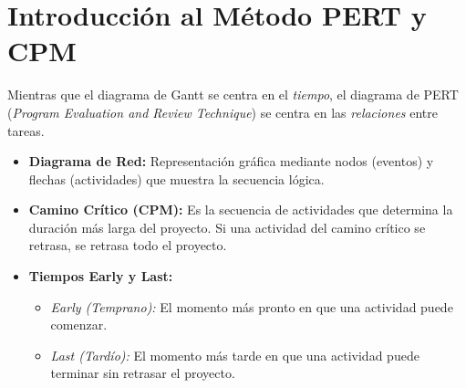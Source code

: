 \documentclass[../main]{subfiles}
\begin{document}
\section{Introducción al Método PERT y CPM}
Mientras que el diagrama de Gantt se centra en el \textit{tiempo}, el diagrama de PERT (\textit{Program Evaluation and Review Technique}) se centra en las \textit{relaciones} entre tareas.

\begin{itemize}
    \item \textbf{Diagrama de Red:} Representación gráfica mediante nodos (eventos) y flechas (actividades) que muestra la secuencia lógica.
    \item \textbf{Camino Crítico (CPM):} Es la secuencia de actividades que determina la duración más larga del proyecto. Si una actividad del camino crítico se retrasa, se retrasa todo el proyecto.
    \item \textbf{Tiempos Early y Last:}
    \begin{itemize}
        \item \textit{Early (Temprano):} El momento más pronto en que una actividad puede comenzar.
        \item \textit{Last (Tardío):} El momento más tarde en que una actividad puede terminar sin retrasar el proyecto.
    \end{itemize}
\end{itemize}

\newpage

\end{document}
